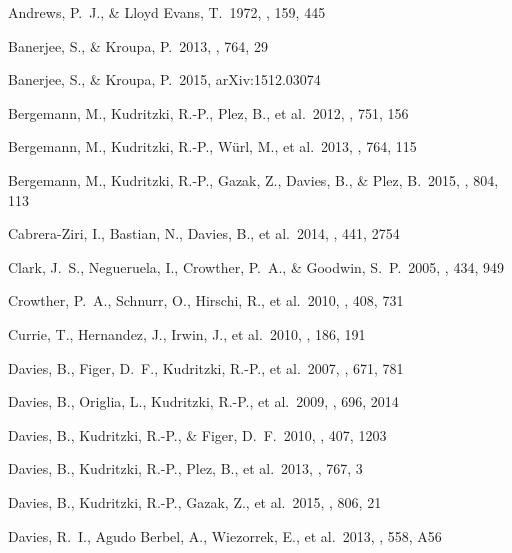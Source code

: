 \documentclass[useAMS,usenatbib]{mn2e}
\begin{document}
\begin{thebibliography}{99}

 Andrews, P.~J., \& Lloyd Evans, T.\ 1972, \mnras, 159, 445

 Banerjee, S., \& Kroupa, P.\ 2013, \apj, 764, 29

 Banerjee, S., \& Kroupa, P.\ 2015, arXiv:1512.03074

 Bergemann, M.,
Kudritzki, R.-P., Plez, B., et al.\ 2012, \apj, 751, 156

 Bergemann, M.,
Kudritzki, R.-P., W{\"u}rl, M., et al.\ 2013, \apj, 764, 115

 Bergemann, M.,
Kudritzki, R.-P., Gazak, Z., Davies, B., \& Plez, B.\ 2015, \apj, 804, 113

 Cabrera-Ziri, I.,
Bastian, N., Davies, B., et al.\ 2014, \mnras, 441, 2754

 Clark, J.~S., Negueruela, I., Crowther, P.~A., \& Goodwin, S.~P.\ 2005, \aap, 434, 949

 Crowther, P.~A.,
Schnurr, O., Hirschi, R., et al.\ 2010, \mnras, 408, 731

 Currie, T., Hernandez,
J., Irwin, J., et al.\ 2010, \apjs, 186, 191

 Davies, B., Figer,
D.~F., Kudritzki, R.-P., et al.\ 2007, \apj, 671, 781

 Davies, B., Origlia, L.,
Kudritzki, R.-P., et al.\ 2009, \apj, 696, 2014

 Davies, B., Kudritzki,
R.-P., \& Figer, D.~F.\ 2010, \mnras, 407, 1203

 Davies, B., Kudritzki,
R.-P., Plez, B., et al.\ 2013, \apj, 767, 3

 Davies, B., Kudritzki,
R.-P., Gazak, Z., et al.\ 2015, \apj, 806, 21

 Davies, R.~I., Agudo Berbel, A., Wiezorrek, E., et al.\ 2013, \aap, 558, A56


\end{thebibliography}
\end{document}
